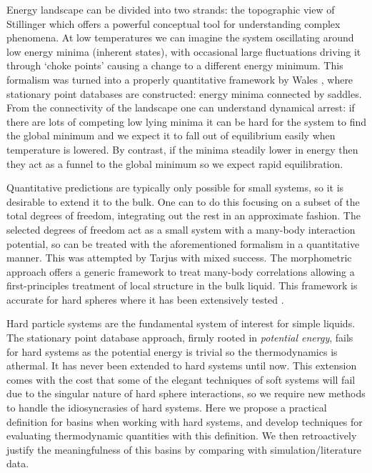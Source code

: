 \documentclass[11pt,twoside]{report}
\begin{document}
Energy landscape can be divided into two strands: the topographic view of Stillinger which offers a powerful conceptual tool for understanding complex phenomena.
At low temperatures we can imagine the system oscillating around low energy minima (inherent states), with occasional large fluctuations driving it through `choke points' causing a change to a different energy minimum.
This formalism was turned into a properly quantitative framework by Wales \cite{Wales2004,?}, where stationary point databases are constructed: energy minima connected by saddles.
From the connectivity of the landscape one can understand dynamical arrest: if there are lots of competing low lying minima it can be hard for the system to find the global minimum and we expect it to fall out of equilibrium easily when temperature is lowered.
By contrast, if the minima steadily lower in energy then they act as a funnel to the global minimum so we expect rapid equilibration.

Quantitative predictions are typically only possible for small systems, so it is desirable to extend it to the bulk.
One can to do this focusing on a subset of the total degrees of freedom, integrating out the rest in an approximate fashion.
The selected degrees of freedom act as a small system with a many-body interaction potential, so can be treated with the aforementioned formalism in a quantitative manner.
This was attempted by Tarjus \cite{?} with mixed success.
The morphometric approach \cite{Konig2004,Roth2006,Robinson2019} offers a generic framework to treat many-body correlations allowing a first-principles treatment of local structure in the bulk liquid.
This framework is accurate for hard spheres where it has been extensively tested \cite{Hansen-Goos?,Roth?,Bob?,Robinson2019}.

Hard particle systems are the fundamental system of interest for simple liquids.
The stationary point database approach, firmly rooted in \emph{potential energy}, fails for hard systems as the potential energy is trivial so the thermodynamics is athermal.
It has never been extended to hard systems until now.
This extension comes with the cost that some of the elegant techniques of soft systems will fail due to the singular nature of hard sphere interactions, so we require new methods to handle the idiosyncrasies of hard systems.
Here we propose a practical definition for basins when working with hard systems, and develop techniques for evaluating thermodynamic quantities with this definition.
We then retroactively justify the meaningfulness of this basins by comparing with simulation/literature data.
\end{document}
